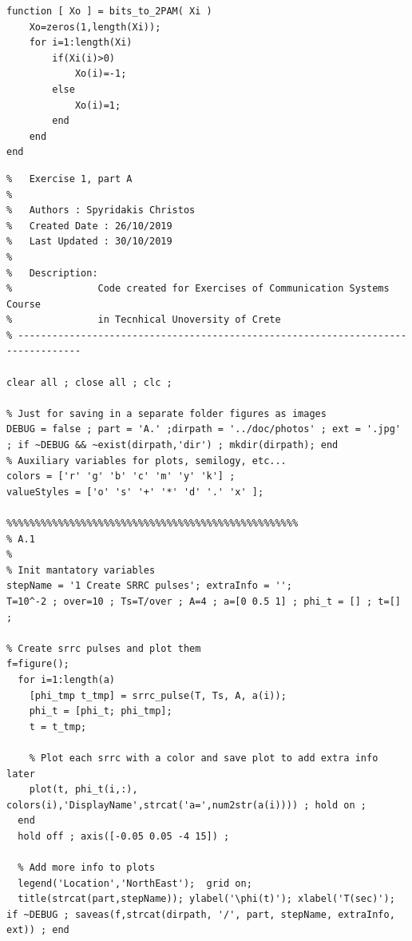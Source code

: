 \documentclass[11pt]{article}
\begin{document}
%
%
%
\newpage

\begin{lstlisting}[caption = {\texttt{bits\_to\_2PAM.m}}]
function [ Xo ] = bits_to_2PAM( Xi )
    Xo=zeros(1,length(Xi));    
    for i=1:length(Xi)    
        if(Xi(i)>0)          
            Xo(i)=-1;        
        else
            Xo(i)=1;    
        end
    end
end
\end{lstlisting}

%
%
%
\begin{lstlisting}[caption = {\texttt{part\_a.m}}]
% ---------------------------------------------------------------------------------
%   Exercise 1, part A
%
%   Authors : Spyridakis Christos
%   Created Date : 26/10/2019
%   Last Updated : 30/10/2019
%
%   Description: 
%               Code created for Exercises of Communication Systems Course
%               in Tecnhical Unoversity of Crete
% ---------------------------------------------------------------------------------

clear all ; close all ; clc ;

% Just for saving in a separate folder figures as images
DEBUG = false ; part = 'A.' ;dirpath = '../doc/photos' ; ext = '.jpg' ; if ~DEBUG && ~exist(dirpath,'dir') ; mkdir(dirpath); end
% Auxiliary variables for plots, semilogy, etc...
colors = ['r' 'g' 'b' 'c' 'm' 'y' 'k'] ;
valueStyles = ['o' 's' '+' '*' 'd' '.' 'x' ];

%%%%%%%%%%%%%%%%%%%%%%%%%%%%%%%%%%%%%%%%%%%%%%%%%%%
% A.1
%
% Init mantatory variables
stepName = '1 Create SRRC pulses'; extraInfo = '';
T=10^-2 ; over=10 ; Ts=T/over ; A=4 ; a=[0 0.5 1] ; phi_t = [] ; t=[] ; 

% Create srrc pulses and plot them 
f=figure();
  for i=1:length(a)
    [phi_tmp t_tmp] = srrc_pulse(T, Ts, A, a(i));
    phi_t = [phi_t; phi_tmp];
    t = t_tmp;
    
    % Plot each srrc with a color and save plot to add extra info later  
    plot(t, phi_t(i,:), colors(i),'DisplayName',strcat('a=',num2str(a(i)))) ; hold on ; 
  end
  hold off ; axis([-0.05 0.05 -4 15]) ;

  % Add more info to plots                                           
  legend('Location','NorthEast');  grid on;
  title(strcat(part,stepName)); ylabel('\phi(t)'); xlabel('T(sec)');  
if ~DEBUG ; saveas(f,strcat(dirpath, '/', part, stepName, extraInfo, ext)) ; end 


\end{lstlisting}
\end{document}

